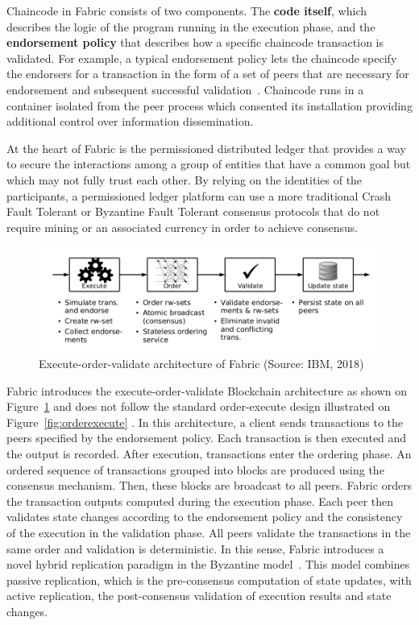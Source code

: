 Chaincode in Fabric consists of two components. The \textbf{code itself}, which
describes the logic of the program running in the execution phase, and the
\textbf{endorsement policy} that describes how a specific chaincode transaction
is validated. For example, a typical endorsement policy lets the chaincode
specify the endorsers for a transaction in the form of a set of peers that are
necessary for endorsement and subsequent successful
validation~\cite{Androulaki2018}. Chaincode runs in a container isolated from
the peer process which consented its installation providing additional control
over information dissemination.

At the heart of Fabric is the permissioned distributed ledger that provides a
way to secure the interactions among a group of entities that have a common
goal but which may not fully trust each other. By relying on the identities of
the participants, a permissioned ledger platform can use a more traditional
Crash Fault Tolerant or Byzantine Fault Tolerant consensus protocols that do
not require mining or an associated currency in order to achieve consensus.

\begin{figure}[h]
  \centering
  \includegraphics[width=1\linewidth]{imgs/executeOrderValidate.png}
  \caption{\label{fig:executeorder} Execute-order-validate architecture of
  Fabric (Source: IBM, 2018)}
\end{figure}

Fabric introduces the execute-order-validate Blockchain architecture as shown
on Figure~\ref{fig:executeorder} and does not follow the standard order-execute
design illustrated on Figure~\ref{fig:orderexecute} \cite{Androulaki2018}. In
this architecture, a client sends transactions to the peers specified by the
endorsement policy. Each transaction is then executed and the output is
recorded. After execution, transactions enter the ordering phase. An ordered
sequence of transactions grouped into blocks are produced using the consensus
mechanism. Then, these blocks are broadcast to all peers. Fabric orders the
transaction outputs computed during the execution phase. Each peer then
validates state changes according to the endorsement policy and the consistency
of the execution in the validation phase. All peers validate the transactions
in the same order and validation is deterministic. In this sense, Fabric
introduces a novel hybrid replication paradigm in the Byzantine
model~\cite{Androulaki2018}. This model combines passive replication, which is
the pre-consensus computation of state updates, with active replication, the
post-consensus validation of execution results and state changes.

